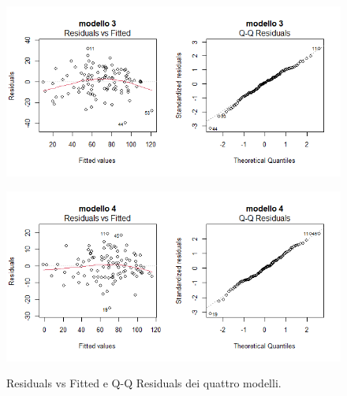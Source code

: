 \begin{figure}[H]
	\centering
	\includegraphics[width=1\linewidth]{../graphs/diagnostica/diagnostica_stepwise}

	\label{fig:diagnosticaridotto}
\end{figure}
\begin{figure}[H]
	\centering
	\includegraphics[width=1\linewidth]{../graphs/diagnostica/diagnostica_stepwise_iterations}
	\label{fig:diagnosticaridotto}
	\caption{Residuals vs Fitted e Q-Q Residuals dei quattro modelli.}
\end{figure}